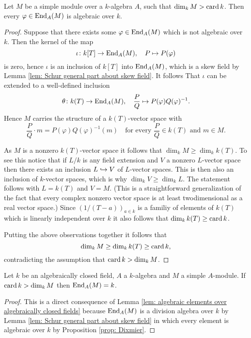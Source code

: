 \begin{prop}[Dixmier]\label{prop: Dixmier}
 Let $M$ be a simple module over a $k$-algebra $A$, such that $\dim_k M > \operatorname{card} k$. Then every $\varphi \in \operatorname{End}_A(M)$ is algebraic over $k$.
\end{prop}
\begin{proof}
 Suppose that there exists some $\varphi \in \operatorname{End}_A(M)$ which is not algebraic over $k$. Then the kernel of the map
 \[
  \iota \colon k[T] \to \operatorname{End}_A(M), \quad P \mapsto P(\varphi)
 \]
 is zero, hence $\iota$ is an inclusion of $k[T]$ into $\operatorname{End}_A(M)$, which is a skew field by Lemma \ref{lem: Schur general part about skew field}. It follows That $\iota$ can be extended to a well-defined inclusion
 \[
  \theta \colon k(T) \to \operatorname{End}_A(M), \quad \frac{P}{Q} \mapsto P(\varphi) Q(\varphi)^{-1}.
 \]
 Hence $M$ carries the structure of a $k(T)$-vector space with
 \[
  \frac{P}{Q} \cdot m = P(\varphi)Q(\varphi)^{-1}(m)
  \quad \text{for every $\frac{P}{Q} \in k(T)$ and $m \in M$}.
 \]
 
 As $M$ is a nonzero $k(T)$-vector space it follows that $\dim_k M \geq \dim_k k(T)$. To see this notice that if $L/k$ is any field extension and $V$ a nonzero $L$-vector space then there exists an inclusion $L \hookrightarrow V$ of $L$-vector spaces. This is then also an inclusion of $k$-vector spaces, which is why $\dim_k V \geq \dim_k L$. The statement follows with $L = k(T)$ and $V = M$. (This is a straightforward generalization of the fact that every complex nonzero vector space is at least twodimensional as a real vector space.) Since $(1/(T-a))_{a \in k}$ is a familiy of elements of $k(T)$ which is linearly independent over $k$ it also follows that $\dim_k k(T) \geq \operatorname{card} k$.

 Putting the above observations together it follows that
 \[
  \dim_k M \geq \dim_k k(T) \geq \operatorname{card} k,
 \]
 contradicting the assumption that $\operatorname{card} k > \dim_k M$.
\end{proof}


\begin{cor}\label{cor: Dixmier algebraically closed}
 Let $k$ be an algebraically closed field, $A$ a $k$-algebra and $M$ a simple $A$-module. If $\operatorname{card} k > \dim_k M$ then $\operatorname{End}_A(M) = k$.
\end{cor}
\begin{proof}
 This is a direct consequence of Lemma \ref{lem: algebraic elements over algebraically closed fields} because $\operatorname{End}_A(M)$ is a division algebra over $k$ by Lemma \ref{lem: Schur general part about skew field} in which every element is algebraic over $k$ by Proposition \ref{prop: Dixmier}.
\end{proof}


